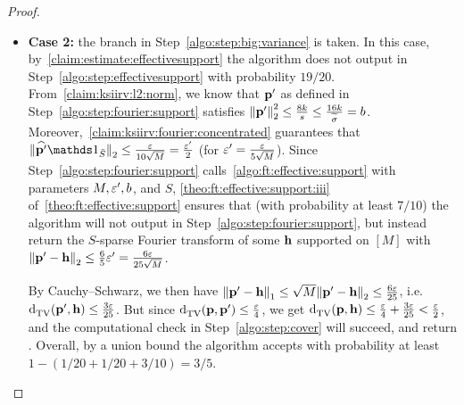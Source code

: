 \begin{proof}
\begin{itemize}
\item\textbf{Case 2:} the branch in Step~\ref{algo:step:big:variance} is taken.
In this case, by~\cref{claim:estimate:effectivesupport} the algorithm does not output \reject in Step~\ref{algo:step:effectivesupport} with probability $19/20$. From~\cref{claim:ksiirv:l2:norm}, we know that $\mathbf{p}'$ as defined in Step~\ref{algo:step:fourier:support} satisfies ${\lVert\mathbf{p}'{\rVert}}_2^2 \leq \frac{8k}{s}\leq \frac{16k}{\widetilde{\sigma}} = b$.  Moreover,~\cref{claim:ksiirv:fourier:concentrated} guarantees that $\normtwo{\fourier{\p'}\indicSet{\bar{S}}} \leq \frac{\eps}{10\sqrt{M}} = \frac{\eps'}{2}$ (for $\varepsilon' = \frac{\varepsilon}{5\sqrt{M}}$). Since Step~\ref{algo:step:fourier:support} calls~\cref{algo:ft:effective:support} with parameters $M, \varepsilon', b$, and $S$, \cref{theo:ft:effective:support:iii} of~\cref{theo:ft:effective:support} ensures that (with probability at least $7/10$) the algorithm will not output \reject in Step~\ref{algo:step:fourier:support}, but instead return the $S$-sparse Fourier transform of some $\mathbf{h}$ supported on $[M]$ with ${\lVert\mathbf{p}'-\mathbf{h}{\rVert}}_2 \leq \frac{6}{5}\varepsilon' = \frac{6\varepsilon}{25\sqrt{M}}$. 

By Cauchy--Schwarz, we then have ${\lVert\mathbf{p}'-\mathbf{h}{\rVert}}_1 \leq \sqrt{M}{\lVert\mathbf{p}'-\mathbf{h}{\rVert}}_2 \leq \frac{6\varepsilon}{25}$, i.e. ${\operatorname{d}_{\textrm{TV}}^{}\!\left({\mathbf{p}', \mathbf{h}}\right)} \leq \frac{3\varepsilon}{25}$. But since
${\operatorname{d}_{\textrm{TV}}^{}\!\left({\mathbf{p}, \mathbf{p}'}\right)} \leq \frac{\varepsilon}{4}$, we get ${\operatorname{d}_{\textrm{TV}}^{}\!\left({\mathbf{p}, \mathbf{h}}\right)} \leq \frac{\varepsilon}{4}+\frac{3\varepsilon}{25} < \frac{\varepsilon}{2}$, and the computational check in Step~\ref{algo:step:cover} will succeed, and return \accept.
Overall, by a union bound the algorithm accepts with probability at least $1-(1/20+1/20+3/10)=3/5$.
\end{itemize}
\end{proof}

